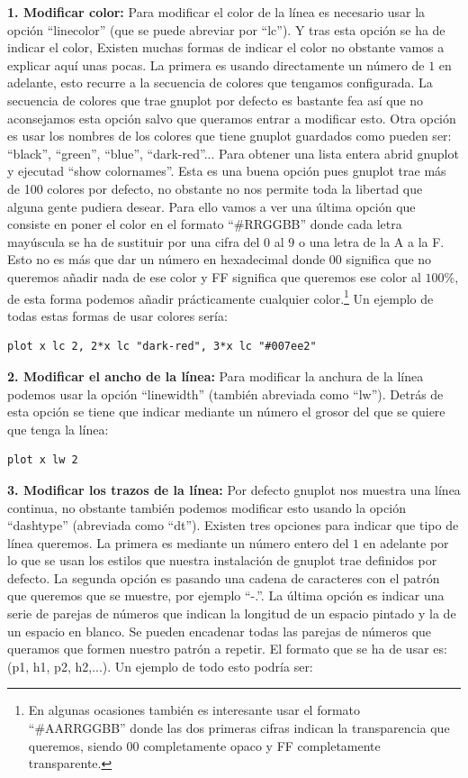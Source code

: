 \documentclass[11pt,a4paper,twoside,pdf]{article}
\numberwithin{equation}{section}
\begin{document}
\textbf{1. Modificar color:} Para modificar el color de la línea es necesario usar la opción ``linecolor'' (que se puede abreviar por ``lc''). Y tras esta opción se ha de indicar el color, Existen muchas formas de indicar el color no obstante vamos a explicar aquí unas pocas. La primera es usando directamente un número de $1$ en adelante, esto recurre a la secuencia de colores que tengamos configurada. La secuencia de colores que trae gnuplot por defecto es bastante fea así que no aconsejamos esta opción salvo que queramos entrar a modificar esto. Otra opción es usar los nombres de los colores que tiene gnuplot guardados como pueden ser: ``black'', ``green'', ``blue'', ``dark-red''... Para obtener una lista entera abrid gnuplot y ejecutad ``show colornames''. Esta es una buena opción pues gnuplot trae más de 100 colores por defecto, no obstante no nos permite toda la libertad que alguna gente pudiera desear. Para ello vamos a ver una última opción que consiste en poner el color en el formato ``\#RRGGBB'' donde cada letra mayúscula se ha de sustituir por una cifra del $0$ al $9$ o una letra de la A a la F. Esto no es más que dar un número en hexadecimal donde 00 significa que no queremos añadir nada de ese color y FF significa que queremos ese color al $100\%$, de esta forma podemos añadir prácticamente cualquier color.\footnote{En algunas ocasiones también es interesante usar el formato ``\#AARRGGBB'' donde las dos primeras cifras indican la transparencia que queremos, siendo 00 completamente opaco y FF completamente transparente.} Un ejemplo de todas estas formas de usar colores sería:

\begin{lstlisting}[language=Gnuplot]
plot x lc 2, 2*x lc "dark-red", 3*x lc "#007ee2"
\end{lstlisting}

\textbf{2. Modificar el ancho de la línea:} Para modificar la anchura de la línea podemos usar la opción ``linewidth'' (también abreviada como ``lw''). Detrás de esta opción se tiene que indicar mediante un número el grosor del que se quiere que tenga la línea:

\begin{lstlisting}[language=Gnuplot]
plot x lw 2
\end{lstlisting}

\textbf{3. Modificar los trazos de la línea:} Por defecto gnuplot nos muestra una línea continua, no obstante también podemos modificar esto usando la opción ``dashtype'' (abreviada como ``dt''). Existen tres opciones para indicar que tipo de línea queremos. La primera es mediante un número entero del $1$ en adelante por lo que se usan los estilos que nuestra instalación de gnuplot trae definidos por defecto. La segunda opción es pasando una cadena de caracteres con el patrón que queremos que se muestre, por ejemplo ``-.''. La última opción es indicar una serie de parejas de números que indican la longitud de un espacio pintado y la de un espacio en blanco. Se pueden encadenar todas las parejas de números que queramos que formen nuestro patrón a repetir. El formato que se ha de usar es: (p1, h1, p2, h2,...). Un ejemplo de todo esto podría ser:
\end{document}

